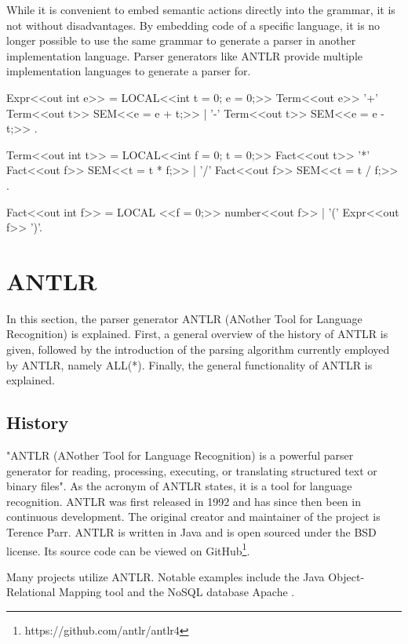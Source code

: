 While it is convenient to embed semantic actions directly into the grammar, it is not without disadvantages. By embedding code of a specific language, it is no longer possible to use the same grammar to generate a parser in another implementation language. Parser generators like ANTLR provide multiple implementation languages to generate a parser for. 

\begin{GenericCode}[float,numbers=none,caption=Attributed Grammar for Coco-2 for simple arithmetic expressions., label=lst:Coco2ATG]
Expr<<out int e>> =    LOCAL<<int t = 0; e = 0;>>
  Term<<out e>>             
  { '+' Term<<out t>>    SEM<<e = e + t;>>
  | '-' Term<<out t>>    SEM<<e = e - t;>>
  }.

Term<<out int t>> =    LOCAL<<int f = 0; t = 0;>>
  Fact<<out t>>
  { '*' Fact<<out f>>  SEM<<t = t * f;>>
  | '/' Fact<<out f>>  SEM<<t = t / f;>>
  }.
  
Fact<<out int f>> =    LOCAL <<f = 0;>>
    number<<out f>>
  | '(' Expr<<out f>> ')'.

\end{GenericCode}

\section{ANTLR}

In this section, the parser generator ANTLR (ANother Tool for Language Recognition) is explained. First, a general overview of the history of ANTLR is given, followed by the introduction of the parsing algorithm currently employed by ANTLR, namely ALL(*). Finally, the general functionality of ANTLR is explained.  

\subsection{History}

"ANTLR (ANother Tool for Language Recognition) is a powerful parser generator for reading, processing, executing, or translating structured text or binary files". As the acronym of ANTLR states, it is a tool for language recognition. ANTLR was first released in 1992 and has since then been in continuous development. The original creator and maintainer of the project is Terence Parr. ANTLR is written in Java and is open sourced under the BSD license. Its source code can be viewed on GitHub\footnote{https://github.com/antlr/antlr4}. 

Many projects utilize ANTLR. Notable examples include the Java Object-Relational Mapping tool \cite{HibernateWeb2024} and the NoSQL database Apache \textcite{Cassandra2024}.

